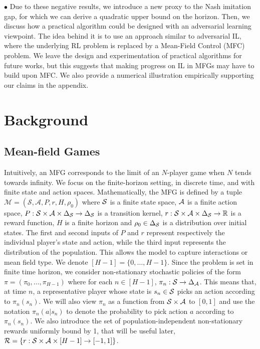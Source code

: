 \documentclass{article}
\begin{document}
$\bullet$ Due to these negative results, we introduce a new proxy to the Nash imitation gap, for which we can derive a quadratic upper bound on the horizon. Then, we discuss how a practical algorithm could be designed with an adversarial learning viewpoint. The idea behind it is to use an approach similar to adversarial IL, where the underlying RL problem is replaced by a Mean-Field Control (MFC) problem. 
We leave the design and experimentation of practical algorithms for future works, but this suggests that making progress on IL in MFGs may have to build upon MFC.
%
We also provide a numerical illustration empirically supporting our claims in the appendix.


\section{Background} %

\subsection{Mean-field Games}\label{sec:mfg}
Intuitively, an MFG corresponds to the limit of an $N$-player game when $N$ tends towards infinity. We focus on the finite-horizon setting, in discrete time, and with finite state and action spaces. Mathematically, the MFG is defined by a tuple  $\mathcal{M}=(\mathcal{S}, \mathcal{A}, P, r, H, \rho_0)$ where $\mathcal{S}$ is a finite state space,  $\mathcal{A}$ is a finite action space,  $P:\mathcal{S}\times\mathcal{A}\times\Delta_{\mathcal{S}} \rightarrow \Delta_{\mathcal{S}}$ is a transition kernel,  $r:\mathcal{S}\times\mathcal{A}\times\Delta_{\mathcal{S}} \rightarrow \mathbb{R}$ is a reward function, $H$ is a finite horizon and  $\rho_0\in\Delta_{\mathcal{S}}$ is a distribution over initial states. The first and second inputs of $P$ and $r$ represent respectively the individual player's state and action, while the third input represents the distribution of the population. This allows the model to capture interactions or mean field type. We denote $[H-1] = \{0,\dots,H-1\}$. 
Since the problem is set in finite time horizon, we consider non-stationary stochastic policies of the form $\pi = (\pi_0, \dots, \pi_{H-1})$ where for each $n \in [H-1]$, $\pi_n: \mathcal{S} \to \Delta_{\mathcal{A}}$. 
This means that, at time $n$, a representative player whose state is $s_n \in \mathcal{S}$ picks an action according to $\pi_n(s_n)$. We will also view $\pi_n$ as a function from $\mathcal{S} \times \mathcal{A}$ to $[0,1]$ and use the notation $\pi_n(a|s_n)$ to denote the probability to pick action $a$ according to $\pi_n(s_n)$. 
%
We also introduce the set of population-independent non-stationary rewards uniformly bound by 1, that will be useful later, $\mathcal{R} = \{r:\mathcal{S}\times\mathcal{A}\times [H-1] \rightarrow[-1,1]\}$.
\end{document}
